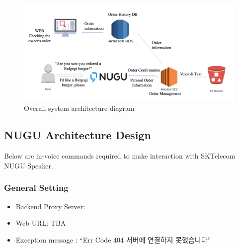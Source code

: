 \documentclass[conference,compsoc]{IEEEtran}
\begin{document}
\begin{figure}[ht!]
  \includegraphics[width=\linewidth]{figures/architecture.png}
  \caption{Overall system architecture diagram}
  \label{fig:architecture}
\end{figure}

\subsection{NUGU Architecture Design}
Below are in-voice commands required to make interaction with SKTelecom NUGU Speaker.  

\subsubsection{General Setting}
\begin{itemize}
  \item Backend Proxy Server:
  \item Web URL: TBA
  \item Exception message : “Err Code 404 서버에 연결하지 못했습니다”
\end{itemize}
\end{document}
